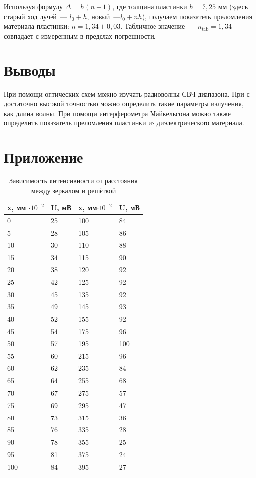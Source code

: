 Используя формулу $\Delta = h(n-1)$, где толщина пластинки $h = 3,25\text{ мм}$ (здесь старый ход лучей~--- $l_0+h$, новый~---$l_0 + nh$), получаем показатель преломления материала пластинки: $n = 1,34 \pm 0,03$.
Табличное значение~--- $n_{\text{tab}} = 1,34$~--- совпадает с измеренным в пределах погрешности. 

\section{Выводы}
При помощи оптических схем можно изучать радиоволны СВЧ-диапазона. При с достаточно высокой точностью можно определить такие параметры излучения, как длина волны. При помощи интерферометра Майкельсона можно также определить показатель преломления пластинки из диэлектрического материала. 

\newpage

\section{Приложение}
\begin{table}[H]
    \centering
    \begin{tabular}{|l|l|l|l|}
    \hline
        x, мм $\cdot 10^{-2}$ & U, мВ & x, мм$\cdot 10^{-2}$ & U, мВ \\ \hline
        0 & 25 & 100 & 84 \\ \hline
        5 & 28 & 105 & 86 \\ \hline
        10 & 30 & 110 & 88 \\ \hline
        15 & 34 & 115 & 90 \\ \hline
        20 & 38 & 120 & 92 \\ \hline
        25 & 42 & 125 & 92 \\ \hline
        30 & 45 & 135 & 92 \\ \hline
        35 & 49 & 145 & 93 \\ \hline
        40 & 52 & 155 & 92 \\ \hline
        45 & 54 & 175 & 96 \\ \hline
        50 & 57 & 195 & 100 \\ \hline
        55 & 60 & 215 & 96 \\ \hline
        60 & 62 & 235 & 84 \\ \hline
        65 & 64 & 255 & 68 \\ \hline
        70 & 67 & 275 & 57 \\ \hline
        75 & 69 & 295 & 47 \\ \hline
        80 & 73 & 315 & 36 \\ \hline
        85 & 76 & 335 & 28 \\ \hline
        90 & 78 & 355 & 25 \\ \hline
        95 & 81 & 375 & 24 \\ \hline
        100 & 84 & 395 & 27 \\ \hline
    \end{tabular}
    \caption{Зависимость интенсивности от расстояния между зеркалом и решёткой}
    \label{tab2}
\end{table}

